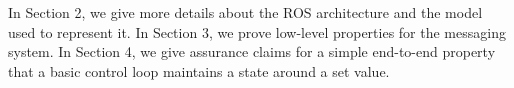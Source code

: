 In Section 2, we give more details about the ROS architecture and the model used to represent it. In Section 3, we prove low-level properties for the messaging system. In Section 4, we give assurance claims for a simple end-to-end property that a basic control loop maintains a state around a set value.